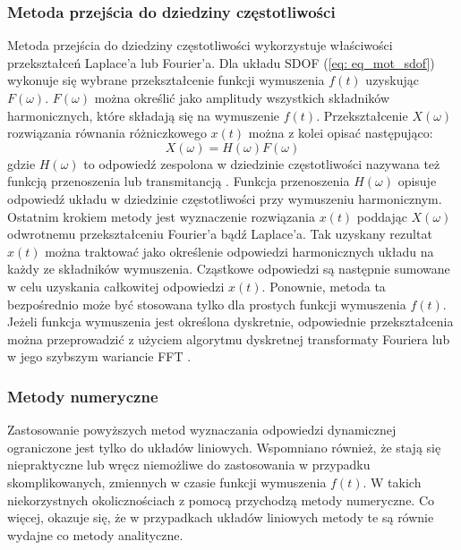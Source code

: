 \subsubsection{Metoda przejścia do dziedziny częstotliwości}

Metoda przejścia do dziedziny częstotliwości  wykorzystuje właściwości przekształceń Laplace'a lub Fourier'a. Dla układu SDOF (\ref{eq: eq_mot_sdof}) wykonuje się wybrane przekształcenie funkcji wymuszenia $f(t)$ uzyskując $F(\omega)$. $F(\omega)$ można określić jako amplitudy wszystkich składników harmonicznych, które składają się na wymuszenie $f(t)$. Przekształcenie $X(\omega)$ rozwiązania równania różniczkowego $x(t)$ można z kolei opisać następująco:
\begin{equation}
	X(\omega)=H(\omega)F(\omega)
\end{equation}
gdzie $H(\omega)$ to odpowiedź zespolona w dziedzinie częstotliwości nazywana też funkcją przenoszenia lub transmitancją . Funkcja przenoszenia $H(\omega)$ opisuje odpowiedź układu w dziedzinie częstotliwości przy wymuszeniu harmonicznym. Ostatnim krokiem metody jest wyznaczenie rozwiązania $x(t)$ poddając $X(\omega)$ odwrotnemu przekształceniu Fourier'a bądź Laplace'a. Tak uzyskany rezultat $x(t)$ można traktować jako określenie odpowiedzi harmonicznych układu na każdy ze składników wymuszenia. Cząstkowe odpowiedzi są następnie sumowane w celu uzyskania całkowitej odpowiedzi $x(t)$. Ponownie, metoda ta bezpośrednio może być stosowana tylko dla prostych funkcji wymuszenia $f(t)$. Jeżeli funkcja wymuszenia jest określona dyskretnie, odpowiednie przekształcenia można przeprowadzić z użyciem algorytmu dyskretnej transformaty Fouriera lub w jego szybszym wariancie FFT .

\subsubsection{Metody numeryczne}

Zastosowanie powyższych metod wyznaczania odpowiedzi dynamicznej ograniczone jest tylko do układów liniowych. Wspomniano również, że stają się niepraktyczne lub wręcz niemożliwe do zastosowania w przypadku skomplikowanych, zmiennych w czasie funkcji wymuszenia $f(t)$. W takich niekorzystnych okolicznościach z pomocą przychodzą metody numeryczne. Co więcej, okazuje się, że w przypadkach układów liniowych metody te są równie wydajne co metody analityczne. 

